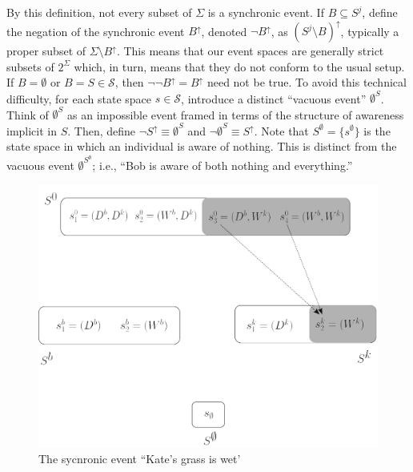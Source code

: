 \documentclass[
11pt,
titlepage,
reqno,
]{article}%
\theoremstyle{definition}
\begin{document}
	By this definition, not every subset of $\Sigma$ is a synchronic event.
	If $B\subseteq S^j$, define the negation of the synchronic event $B^{\uparrow}$, denoted $\lnot B^{\uparrow}$, as $(S^j\setminus B)^{\uparrow}$, typically a proper subset of $\Sigma\setminus B^{\uparrow}$.
	This means that our event spaces are generally strict subsets of $2^\Sigma$ which, in turn, means that they do not conform to the usual setup.
	If $B=\emptyset$ or $B=S\in\mathcal{S}$, then $\lnot\lnot B^\uparrow = B^\uparrow$ need not be true.
	To avoid this technical difficulty, for each state space $s\in\mathcal{S}$, introduce a distinct ``vacuous event'' $\emptyset^S$.
	Think of $\emptyset^S$ as an impossible event framed in terms of the structure of awareness implicit in $S$.
	Then, define $\lnot S^\uparrow\equiv \emptyset^S$ and $\lnot \emptyset^S\equiv S^\uparrow$.
	Note that $S^\emptyset=\{s^\emptyset\}$ is the state space in which an individual is aware of nothing. 
	This is distinct from the vacuous event $\emptyset^{S^\emptyset}$; i.e., ``Bob is aware of both nothing and everything.''


	\begin{figure}[h!]	
		\begin{center}
			\includegraphics[scale=.4]{lattice-event.png}
		\end{center}
		\caption{The sycnronic event ``Kate's grass is wet'\label{lattice-event}}
	\end{figure}
	
\end{document}

